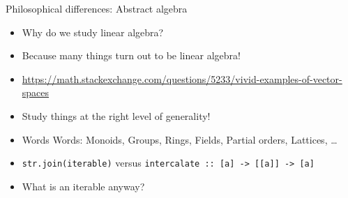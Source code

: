 \documentclass[8pt]{beamer}
\newcommand{\raw}[1]{\texttt{#1}}
\newcommand{\hs}[1]{\texttt{#1}}
\begin{document}
\begin{frame}[fragile]{Philosophical differences: Abstract algebra}
    \begin{itemize}
        \item Why do we study linear algebra? \pause
        \item Because many things turn out to be linear algebra! \pause
        \item \url{https://math.stackexchange.com/questions/5233/vivid-examples-of-vector-spaces} \pause
        \item Study things at the right level of generality! \pause
        \item Words Words: Monoids, Groups, Rings, Fields, Partial orders, Lattices, \dots \pause
        \item \raw{str.join(iterable)} versus \hs{intercalate :: [a] -> [[a]] -> [a]} \pause
        \item What is an iterable anyway? \pause
    \end{itemize}
\end{frame}
\end{document}
